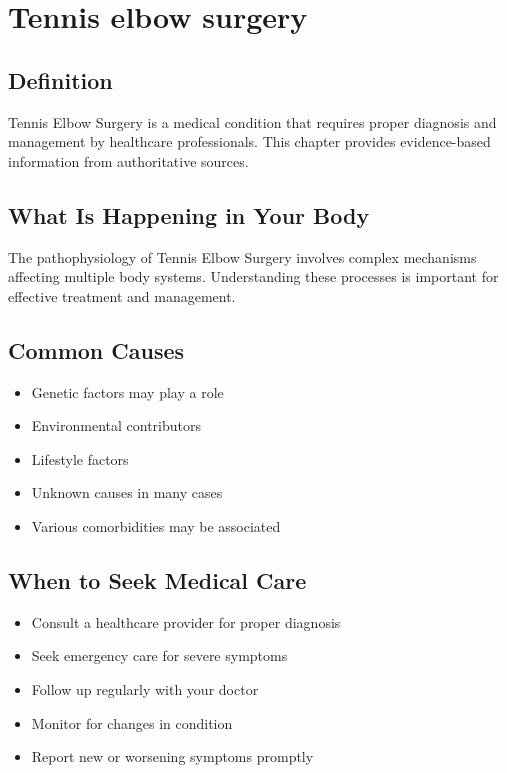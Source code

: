 
\chapter{Tennis elbow surgery}

\section*{Definition}
Tennis Elbow Surgery is a medical condition that requires proper diagnosis and management by healthcare professionals. This chapter provides evidence-based information from authoritative sources.

\section*{What Is Happening in Your Body}
The pathophysiology of Tennis Elbow Surgery involves complex mechanisms affecting multiple body systems. Understanding these processes is important for effective treatment and management.

\section*{Common Causes}
\begin{itemize}
  \item Genetic factors may play a role
  \item Environmental contributors
  \item Lifestyle factors
  \item Unknown causes in many cases
  \item Various comorbidities may be associated
\end{itemize}

\section*{When to Seek Medical Care}
\begin{itemize}
  \item Consult a healthcare provider for proper diagnosis
  \item Seek emergency care for severe symptoms
  \item Follow up regularly with your doctor
  \item Monitor for changes in condition
  \item Report new or worsening symptoms promptly
\end{itemize}


